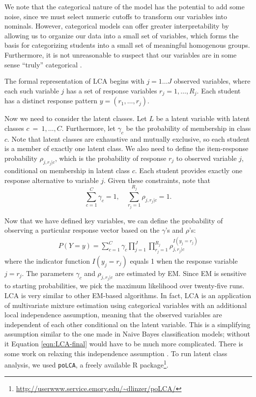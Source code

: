 \documentclass{edm_template}
\begin{document}
We note that the categorical nature of the model has the potential to add some noise, since we must select numeric cutoffs to transform our variables into nominals. However, categorical models can offer greater interpretability by allowing us to organize our data into a small set of variables, which forms the basis for categorizing students into a small set of meaningful homogenous groups. Furthermore, it is not unreasonable to suspect that our variables are in some sense ``truly'' categorical \cite[pp8--9]{Collins2009}. 

The formal representation of LCA begins with $j = 1 \ldots J$ observed variables, where each such variable $j$ has a set of response variables $r_{j} = 1,\ldots,R_{j}$. Each student has a distinct response pattern $y = (r_{1},\ldots,r_{j})$.

Now we need to consider the latent classes. Let $L$ be a latent variable with latent classes $c~=~1,\ldots,C$. Furthermore, let $\gamma_{c}$ be the probability of membership in class $c$. Note that latent classes are exhaustive and mutually exclusive, so each student is a member of exactly one latent class. We also need to define the item-response probability $\rho_{j,r_{j}|c}$, which is the probability of response $r_{j}$ to observed variable $j$, conditional on membership in latent class $c$. Each student provides exactly one response alternative to variable $j$. Given these constraints, note that
\[ \sum_{c=1}^{C} \gamma_{c} = 1,\quad \sum_{r_{j}=1}^{R_{j}} \rho_{j,r_{j}|c} = 1. \] 

Now that we have defined key variables, we can define the probability of observing a particular response vector based on the $\gamma$'s and $\rho$'s:
\begin{align}
P(Y = y) = \sum_{c=1}^{C} \gamma_{c} \prod_{j=1}^{J} \prod_{r_{j}=1}^{R_{j}} \rho_{j,r_{j}|c}^{I(y_{j} = r_{j})}
\label{eqn:LCA-final}
\end{align}
where the indicator function $I(y_{j} = r_{j})$ equals 1 when the response variable $j = r_{j}$. The parameters $\gamma_{c}$ and $\rho_{j,r_{j}|c}$ are estimated by EM. Since EM is sensitive to starting probabilities, we pick the maximum likelihood over twenty-five runs. LCA is very similar to other EM-based algorithms. In fact, LCA is an application of multivariate mixture estimation using categorical variables with an additional local independence assumption, meaning that the observed variables are independent of each other conditional on the latent variable. This is a simplifying assumption similar to the one made in Naive Bayes classification models; without it Equation \ref{eqn:LCA-final} would have to be much more complicated. There is some work on relaxing this independence assumption \cite{Hagenaars1988,Garrett2004}. To run latent class analysis, we used \texttt{poLCA}, a freely available R package\footnote{\url{http://userwww.service.emory.edu/~dlinzer/poLCA/}}.
\end{document}
